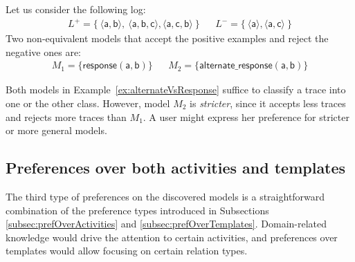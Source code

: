\begin{example}
\label{ex:alternateVsResponse}
Let us consider the following log:
\begin{align*}
L^+  = \{\ \langle \mathsf{a}, \mathsf{b} \rangle,\ \langle \mathsf{a}, \mathsf{b}, \mathsf{c} \rangle, \langle \mathsf{a}, \mathsf{c}, \mathsf{b} \rangle \ \} &&
L^-  = \{\ \langle \mathsf{a} \rangle, \langle \mathsf{a}, \mathsf{c} \rangle \ \}
\end{align*}
%
Two non-equivalent models that accept the positive examples and reject the negative ones are:
\begin{align*}
M_1  = \{ \mathsf{response(a,b)}\} &&
M_2  = \{ \mathsf{alternate\_response(a, b)}\} \tag*{$\square$}
\end{align*}
\end{example}

Both models in Example~\ref{ex:alternateVsResponse} 
suffice to classify a trace into one or the other class. However, model $M_2$ %
is \emph{stricter}, since it accepts less traces and rejects more traces than $M_1$. %
A  user might express her preference for stricter or more general models.


\subsection{Preferences over both activities and templates}
\label{sub:prefOverBoth}

The third type of preferences on the discovered models is a straightforward combination of the preference types introduced in Subsections \ref{subsec:prefOverActivities} and \ref{subsec:prefOverTemplates}. Domain-related knowledge would drive the attention to certain activities, and preferences over templates would allow focusing on certain relation types.%


